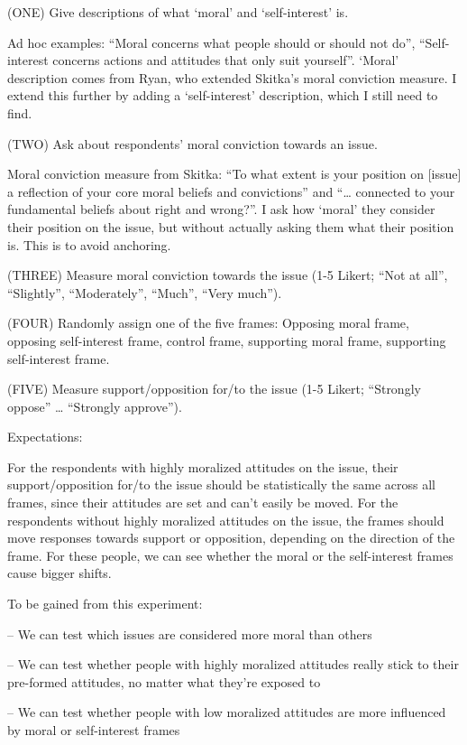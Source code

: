 \documentclass[12pt,econ]{sources/authesis}
\begin{document}
(ONE) Give descriptions of what `moral' and `self-interest' is.

Ad hoc examples: ``Moral concerns what people should or should not do'', ``Self-interest concerns actions and attitudes that only suit yourself''.
`Moral' description comes from Ryan, who extended Skitka's moral conviction measure. I extend this further by adding a `self-interest' description, which I still need to find.

(TWO) Ask about respondents' moral conviction towards an issue.

Moral conviction measure from Skitka: ``To what extent is your position on {[}issue{]} a reflection of your core moral beliefs and convictions'' and ``\ldots{} connected to your fundamental beliefs about right and wrong?''.
I ask how `moral' they consider their position on the issue, but without actually asking them what their position is. This is to avoid anchoring.

(THREE) Measure moral conviction towards the issue (1-5 Likert; ``Not at all'', ``Slightly'', ``Moderately'', ``Much'', ``Very much'').

(FOUR) Randomly assign one of the five frames: Opposing moral frame, opposing self-interest frame, control frame, supporting moral frame, supporting self-interest frame.

(FIVE) Measure support/opposition for/to the issue (1-5 Likert; ``Strongly oppose'' \ldots{} ``Strongly approve'').

Expectations:

For the respondents with highly moralized attitudes on the issue, their support/opposition for/to the issue should be statistically the same across all frames, since their attitudes are set and can't easily be moved. For the respondents without highly moralized attitudes on the issue, the frames should move responses towards support or opposition, depending on the direction of the frame. For these people, we can see whether the moral or the self-interest frames cause bigger shifts.

To be gained from this experiment:

-- We can test which issues are considered more moral than others

-- We can test whether people with highly moralized attitudes really stick to their pre-formed attitudes, no matter what they're exposed to

-- We can test whether people with low moralized attitudes are more influenced by moral or self-interest frames
\end{document}

